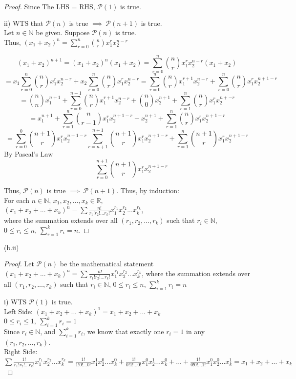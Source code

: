 \documentclass[12pt,letterpaper, onecolumn]{exam}
\newcommand{\real}{\mathbb{R}}
\newcommand{\nat}{\mathbb{N}}
\newcommand{\power}{\mathcal{P}}
\begin{document}
\begin{questions}
\begin{solution}
\begin{proof}
    Since The LHS = RHS, $\power(1)$ is true.

    ii) WTS that $\power(n)$ is true $ \implies \: \power(n+1)$ is true. \\
    Let $n \in \nat$ be given. Suppose $\power(n)$ is true. \\
    Thus, $(x_1 +x_2 )^n = \sum_{r=0}^n\binom{n}{r}x_1^rx_2^{n-r}$

    \[(x_1 + x_2)^{n+1} = (x_1 + x_2)^{n}(x_1 + x_2) = \sum_{r=0}^n\binom{n}{r}x_1^rx_2^{n-r} (x_1 + x_2)\]
    \[= x_1\sum_{r=0}^n\binom{n}{r}x_1^rx_2^{n-r} + x_2 \sum_{r=0}^n\binom{n}{r}x_1^rx_2^{n-r} = \sum_{r=0}^n\binom{n}{r}x_1^{r+1}x_2^{n-r} + \sum_{r=0}^n\binom{n}{r}x_1^rx_2^{n+1-r}\]
    \[=\binom{n}{n}x_1^{n+1} + \sum_{r=0}^{n-1}\binom{n}{r}x_1^{r+1} x_2^{n-r} + \binom{n}{0}x_2^{n+1} + \sum_{r=1}^{n}\binom{n}{r}x_1^{r} x_2^{n+-r}\] 
    \[=x_1^{n+1} + \sum_{r=1}^{n}\binom{n}{r-1}x_1^{r} x_2^{n+1-r} + x_2^{n+1} + \sum_{r=1}^{n}\binom{n}{r}x_1^{r} x_2^{n+1-r}\]
    \[= \sum_{r=0}^{0}\binom{n+1}{r}x_1^rx_2^{n+1-r} \sum_{r=n+1}^{n+1}\binom{n+1}{r}x_1^rx_2^{n+1-r} + \sum_{r=1}^{n}\binom{n+1}{r}x_1^{r} x_2^{n+1-r}\]
    By Pascal's Law
    \[= \sum_{r=0}^{n+1} \binom{n+1}{r}x_1^rx_2^{n+1-r}\]

    Thus, $\power(n)$ is true $\implies \: \power(n+1)$. Thus, by induction: \\
    For each $n \in \nat$, $x_1,x_2,...,x_k \in \real$, \\
    $(x_1 +x_2 +...+x_k )^n = \sum \frac{n!}{r_1!r_2!...r_k!}x_1^{r_1}x_2^{r_2} ...x_k^{r_k}$, \\
where the summation extends over all $(r_1,r_2,...,r_k)$ such
that $r_i \in \nat$, \\ $0\leq r_i \leq n$, $\sum^k_{r=1}r_i =n$.
    \end{proof}

    (b.ii) 
    \begin{proof}
    Let $\power(n)$ be the mathematical statement \\ $(x_1 +x_2 +...+x_k )^n = \sum_{} \frac{n!}{r_1!r_2!...r_k!}x_1^{r_1}x_2^{r_2} ...x_k^{r_k}$, where the summation extends over all $(r_1,r_2,...,r_k)$ such that $r_i \in \nat$, $0\leq r_i \leq n$, $\sum^k_{i=1}r_i =n$
    
    i) WTS $\power(1)$ is true. \\
        Left Side:  $(x_1 +x_2 +...+x_k )^1 = x_1 +x_2 +...+x_k$\\
            $0 \leq r_i \leq 1, \: \sum_{i=1}^k r_i = 1$ \\
            Since $r_i \in \nat$, and $\sum_{i=1}^kr_i$, we know that exactly one $r_i =1$ in any $(r_1, r_2, ..., r_k)$. \\
        Right Side: $\sum \frac{1!}{r_1!r_2!...r_k!}x_1^{r_1}x_2^{r_2} ...x_k^{r_k} = \frac{1!}{1!0!...0!}x_1^1x_2^0...x_k^0 + \frac{1!}{0!1!...0!}x_1^0x_2^1...x_k^0 + ... + \frac{1!}{0!0!...1!}x_1^0x_2^0...x_k^1 = x_1 + x_2 + ... + x_k$


\end{proof}
\end{solution}
\end{questions}
\end{document}
